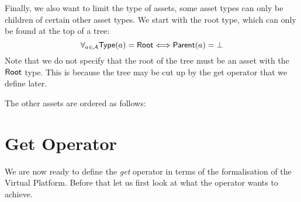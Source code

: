 Finally, we also want to limit the type of assets, some asset types can only
be children of certain other asset types. We start with the root type, which
can only be found at the top of a tree:
\[
  \forall_{a \in \mathcal{A}} {\sf Type}(a) = {\sf Root} \Longleftrightarrow {\sf Parent}(a) = \bot
\]
Note that we do not specify that the root of the tree must be an asset with the
\( {\sf Root} \) type. This is because the tree may be cut up by the get
operator that we define later.

The other assets are ordered as follows:
\begin{center}
\end{center}

\section{Get Operator}\label{sec:vp:getoperator}
We are now ready to define the \emph{get} operator in terms of the
formalisation of the Virtual Platform. Before that let us first look at what
the operator wants to achieve.


